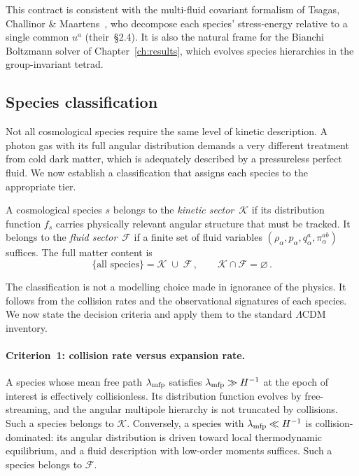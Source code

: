 This contract is consistent with the multi-fluid covariant
formalism of Tsagas, Challinor \&
Maartens~\cite{Tsagas2008}, who decompose
each species' stress-energy relative to a single common
$u^a$ (their~\S2.4).  It is also the natural frame for
the Bianchi Boltzmann solver of Chapter~\ref{ch:results},
which evolves species hierarchies in the group-invariant
tetrad.


\subsection{Species classification}
\label{sec:species-class}

Not all cosmological species require the same level of
kinetic description.  A photon gas with its full angular
distribution demands a very different treatment from cold
dark matter, which is adequately described by a pressureless
perfect fluid.  We now establish a classification that
assigns each species to the appropriate tier.

\begin{definition}
\label{def:sectors}
A cosmological species $s$ belongs to the \emph{kinetic
sector}~$\mathcal{K}$ if its distribution function $f_s$
carries physically relevant angular structure that must be
tracked.  It belongs to the \emph{fluid
sector}~$\mathcal{F}$ if a finite set of fluid variables
$(\rho_\alpha, p_\alpha, q_\alpha^a, \pi_\alpha^{ab})$
suffices.  The full matter content is
\begin{equation}\label{eq:sector-union}
\{\text{all species}\}
= \mathcal{K} \;\cup\; \mathcal{F}\,,
\qquad
\mathcal{K} \cap \mathcal{F} = \varnothing\,.
\end{equation}
\end{definition}

The classification is not a modelling choice made in
ignorance of the physics.  It follows from the collision
rates and the observational signatures of each species.
We now state the decision criteria and apply them to the
standard $\Lambda$CDM inventory.


\paragraph{Criterion~1: collision rate versus expansion rate.}

A species whose mean free path $\lambda_{\rm mfp}$ satisfies
$\lambda_{\rm mfp} \gg H^{-1}$ at the epoch of interest is
effectively collisionless.  Its distribution function
evolves by free-streaming, and the angular multipole
hierarchy is not truncated by collisions.  Such a species
belongs to $\mathcal{K}$.  Conversely, a species with
$\lambda_{\rm mfp} \ll H^{-1}$ is collision-dominated:
its angular distribution is driven toward local thermodynamic
equilibrium, and a fluid description with low-order
moments suffices.  Such a species belongs to $\mathcal{F}$.


